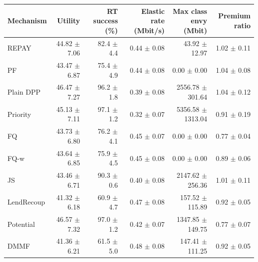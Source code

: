 \begin{tabular}{lrrrrr}
\toprule
Mechanism & Utility & RT success (\%) & Elastic rate (Mbit/s) & Max class envy (Mbit) & Premium ratio \\
\midrule
REPAY & 44.82 $\pm$ 7.06 & 82.4 $\pm$ 4.4 & 0.44 $\pm$ 0.08 & 43.92 $\pm$ 12.97 & 1.02 $\pm$ 0.11 \\
PF & 43.47 $\pm$ 6.87 & 75.4 $\pm$ 4.9 & 0.44 $\pm$ 0.08 & 0.00 $\pm$ 0.00 & 1.04 $\pm$ 0.08 \\
Plain DPP & 46.47 $\pm$ 7.27 & 96.2 $\pm$ 1.8 & 0.39 $\pm$ 0.08 & 2556.78 $\pm$ 301.64 & 1.04 $\pm$ 0.12 \\
Priority & 45.13 $\pm$ 7.11 & 97.1 $\pm$ 1.2 & 0.32 $\pm$ 0.07 & 5356.58 $\pm$ 1313.04 & 0.91 $\pm$ 0.19 \\
\midrule
FQ & 43.73 $\pm$ 6.80 & 76.2 $\pm$ 4.1 & 0.45 $\pm$ 0.07 & 0.00 $\pm$ 0.00 & 0.77 $\pm$ 0.04 \\
FQ-w & 43.64 $\pm$ 6.85 & 75.9 $\pm$ 4.5 & 0.45 $\pm$ 0.08 & 0.00 $\pm$ 0.00 & 0.89 $\pm$ 0.06 \\
JS & 43.46 $\pm$ 6.71 & 90.3 $\pm$ 0.6 & 0.40 $\pm$ 0.08 & 2147.62 $\pm$ 256.36 & 1.01 $\pm$ 0.11 \\
LendRecoup & 41.32 $\pm$ 6.18 & 60.9 $\pm$ 4.7 & 0.47 $\pm$ 0.08 & 157.52 $\pm$ 115.89 & 0.92 $\pm$ 0.05 \\
Potential & 46.57 $\pm$ 7.32 & 97.0 $\pm$ 1.2 & 0.42 $\pm$ 0.07 & 1347.85 $\pm$ 149.75 & 0.77 $\pm$ 0.07 \\
DMMF & 41.36 $\pm$ 6.21 & 61.5 $\pm$ 5.0 & 0.48 $\pm$ 0.08 & 147.41 $\pm$ 111.25 & 0.92 $\pm$ 0.05 \\
\bottomrule
\end{tabular}
